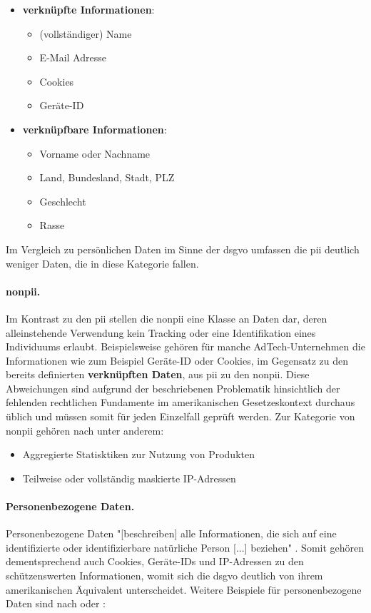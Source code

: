 \begin{itemize}
	\item \textbf{verknüpfte Informationen}:
		\begin{itemize}
			\item (vollständiger) Name
			\item E-Mail Adresse
			\item Cookies
			\item Geräte-ID
		\end{itemize}
	\item \textbf{verknüpfbare Informationen}:
		\begin{itemize}
			\item Vorname oder Nachname
			\item Land, Bundesland, Stadt, PLZ
			\item Geschlecht
			\item Rasse
		\end{itemize}
\end{itemize}

\noindent Im Vergleich zu persönlichen Daten im Sinne der \ac{dsgvo} umfassen die \acs{pii} deutlich weniger Daten, die in diese Kategorie fallen.

\paragraph{\acf{nonpii}.}
\label{sec:Grundlagen:para:Non Personal Identifiable Information}
Im Kontrast zu den \ac{pii} stellen die \ac{nonpii} eine Klasse an Daten dar, deren alleinstehende Verwendung kein Tracking oder eine Identifikation eines Individuums erlaubt. Beispielsweise gehören für manche AdTech-Unternehmen die Informationen wie zum Beispiel Geräte-ID oder Cookies, im Gegensatz zu den bereits definierten \textbf{verknüpften Daten}, aus \ac{pii} zu den \ac{nonpii}. Diese Abweichungen sind aufgrund der beschriebenen Problematik hinsichtlich der fehlenden rechtlichen Fundamente im amerikanischen Gesetzeskontext durchaus üblich und müssen somit für jeden Einzelfall geprüft werden. Zur Kategorie von \ac{nonpii} gehören nach \cite{Matuszewska2021} unter anderem:

\begin{itemize}
	\item Aggregierte Statisktiken zur Nutzung von Produkten
	\item Teilweise oder vollständig maskierte IP-Adressen
\end{itemize} 

\paragraph{Personenbezogene Daten.}
\label{sec:Grundlagen:para:Personenbezogene Daten}
Personenbezogene Daten "[beschreiben] alle Informationen, die sich auf eine identifizierte oder identifizierbare natürliche Person [...] beziehen" \cite{DSGVOArt4}. Somit gehören dementsprechend auch Cookies, Geräte-IDs und IP-Adressen zu den schützenswerten Informationen, womit sich die \ac{dsgvo} deutlich von ihrem amerikanischen Äquivalent unterscheidet. Weitere Beispiele für personenbezogene Daten sind nach \cite{Matuszewska2021} oder \cite{DSGVOPerDa}:

